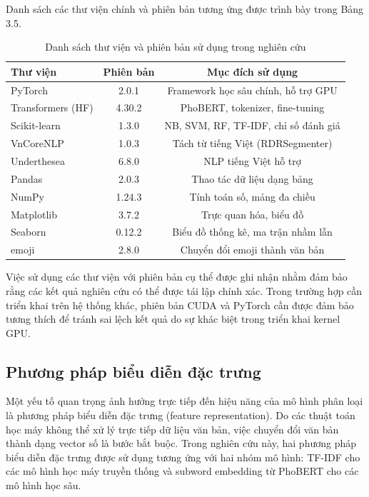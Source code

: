 \documentclass[14pt, a4paper]{report}
\begin{document}
Danh sách các thư viện chính và phiên bản tương ứng được trình bày trong Bảng 3.5.


\begin{table}[h]
\centering
\caption{Danh sách thư viện và phiên bản sử dụng trong nghiên cứu}
\begin{tabular}{|l|c|c|}
\hline
\textbf{Thư viện} & \textbf{Phiên bản} & \textbf{Mục đích sử dụng} \\
\hline
PyTorch & 2.0.1 & Framework học sâu chính, hỗ trợ GPU \\
\hline
Transformers (HF) & 4.30.2 & PhoBERT, tokenizer, fine-tuning \\
\hline
Scikit-learn & 1.3.0 & NB, SVM, RF, TF-IDF, chỉ số đánh giá \\
\hline
VnCoreNLP & 1.0.3 & Tách từ tiếng Việt (RDRSegmenter) \\
\hline
Underthesea & 6.8.0 & NLP tiếng Việt hỗ trợ \\
\hline
Pandas & 2.0.3 & Thao tác dữ liệu dạng bảng \\
\hline
NumPy & 1.24.3 & Tính toán số, mảng đa chiều \\
\hline
Matplotlib & 3.7.2 & Trực quan hóa, biểu đồ \\
\hline
Seaborn & 0.12.2 & Biểu đồ thống kê, ma trận nhầm lẫn \\
\hline
emoji & 2.8.0 & Chuyển đổi emoji thành văn bản \\
\hline
\end{tabular}
\end{table}




Việc sử dụng các thư viện với phiên bản cụ thể được ghi nhận nhằm đảm bảo rằng các kết quả nghiên cứu có thể được tái lập chính xác. Trong trường hợp cần triển khai trên hệ thống khác, phiên bản CUDA và PyTorch cần được đảm bảo tương thích để tránh sai lệch kết quả do sự khác biệt trong triển khai kernel GPU.


\subsection{Phương pháp biểu diễn đặc trưng}


Một yếu tố quan trọng ảnh hưởng trực tiếp đến hiệu năng của mô hình phân loại là phương pháp biểu diễn đặc trưng (feature representation). Do các thuật toán học máy không thể xử lý trực tiếp dữ liệu văn bản, việc chuyển đổi văn bản thành dạng vector số là bước bắt buộc. Trong nghiên cứu này, hai phương pháp biểu diễn đặc trưng được sử dụng tương ứng với hai nhóm mô hình: TF-IDF cho các mô hình học máy truyền thống và subword embedding từ PhoBERT cho các mô hình học sâu.
\end{document}
